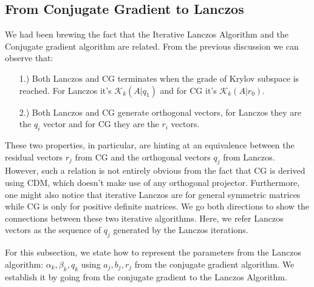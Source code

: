 \documentclass[]{article}
\theoremstyle{definition}
\begin{document}
    \subsection{From Conjugate Gradient to Lanczos}
        We had been brewing the fact that the Iterative Lanczos Algorithm and the Conjugate gradient algorithm are related. From the previous discussion we can observe that: 
        \begin{enumerate}
            \item [1.)] Both Lanczos and CG terminates when the grade of Krylov subspace is reached. For Lanczos it's $\mathcal K_k(A|q_1)$ and for CG it's $\mathcal K_k(A|r_0)$.
            \item [2.)] Both Lanczos and CG generate orthogonal vectors, for Lanczos they are the $q_i$ vector and for CG they are the $r_i$ vectors. 
        \end{enumerate}
        These two properties, in particular, are hinting at an equivalence between the residual vectors $r_j$ from CG and the orthogonal vectors $q_j$ from Lanczos. However, such a relation is not entirely obvious from the fact that CG is derived using CDM, which doesn't make use of any orthogonal projector. Furthermore, one might also notice that iterative Lanczos are for general symmetric matrices while CG is only for positive definite matrices. We go both directions to show the connections between these two iterative algorithms. Here, we refer Lanczos vectors as the sequence of $q_j$ generated by the Lanczos iterations. 
        \par
        For this subsection, we state how to represent the parameters from the Lanczos algorithm: $\alpha_k, \beta_k, q_k$ using $a_j, b_j, r_j$ from the conjugate gradient algorithm. We establish it by going from the conjugate gradient to the Lanczos Algorithm. 
\end{document}
